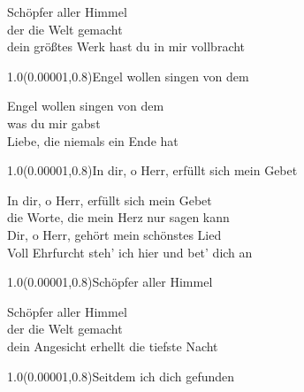 \documentclass[aspectratio=169]{beamer}
\begin{document}
\color{white}
\begin{frame}
\centering
\color{white}
\huge{Schöpfer aller Himmel} \\
\huge{der die Welt gemacht} \\
\huge{dein größtes Werk hast du in mir vollbracht} \\

\begin{textblock}{1.0}(0.00001,0.8)\color{gray}\normalsize{Engel wollen singen von dem}\end{textblock}
\end{frame}

\begin{frame}
\centering
\color{white}
\huge{Engel wollen singen von dem} \\
\huge{was du mir gabst} \\
\huge{Liebe, die niemals ein Ende hat} \\

\begin{textblock}{1.0}(0.00001,0.8)\color{gray}\normalsize{In dir, o Herr, erfüllt sich mein Gebet}\end{textblock}
\end{frame}

\begin{frame}
\centering
\color{white}
\huge{In dir, o Herr, erfüllt sich mein Gebet} \\
\huge{die Worte, die mein Herz nur sagen kann} \\
\huge{Dir, o Herr, gehört mein schönstes Lied} \\
\huge{Voll Ehrfurcht steh' ich hier und bet' dich an} \\

\begin{textblock}{1.0}(0.00001,0.8)\color{gray}\normalsize{Schöpfer aller Himmel}\end{textblock}
\end{frame}

\begin{frame}
\centering
\color{white}
\huge{Schöpfer aller Himmel} \\
\huge{der die Welt gemacht} \\
\huge{dein Angesicht erhellt die tiefste Nacht} \\

\begin{textblock}{1.0}(0.00001,0.8)\color{gray}\normalsize{Seitdem ich dich gefunden}\end{textblock}
\end{frame}
\end{document}
